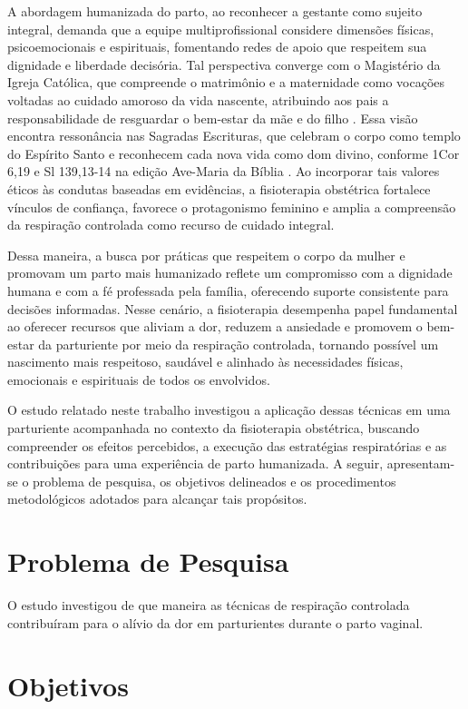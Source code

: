 \documentclass[openright]{tex/estilos/normas-utf-tex}
\begin{document}
A abordagem humanizada do parto, ao reconhecer a gestante como sujeito integral, demanda que a equipe multiprofissional considere dimensões físicas, psicoemocionais e espirituais, fomentando redes de apoio que respeitem sua dignidade e liberdade decisória. Tal perspectiva converge com o Magistério da Igreja Católica, que compreende o matrimônio e a maternidade como vocações voltadas ao cuidado amoroso da vida nascente, atribuindo aos pais a responsabilidade de resguardar o bem-estar da mãe e do filho \cite[p.~431-432]{catecismo2000}. Essa visão encontra ressonância nas Sagradas Escrituras, que celebram o corpo como templo do Espírito Santo e reconhecem cada nova vida como dom divino, conforme 1Cor 6,19 e Sl 139,13-14 na edição Ave-Maria da Bíblia \cite{biblia2018}. Ao incorporar tais valores éticos às condutas baseadas em evidências, a fisioterapia obstétrica fortalece vínculos de confiança, favorece o protagonismo feminino e amplia a compreensão da respiração controlada como recurso de cuidado integral.

Dessa maneira, a busca por práticas que respeitem o corpo da mulher e promovam um parto mais humanizado reflete um compromisso com a dignidade humana e com a fé professada pela família, oferecendo suporte consistente para decisões informadas. Nesse cenário, a fisioterapia desempenha papel fundamental ao oferecer recursos que aliviam a dor, reduzem a ansiedade e promovem o bem-estar da parturiente por meio da respiração controlada, tornando possível um nascimento mais respeitoso, saudável e alinhado às necessidades físicas, emocionais e espirituais de todos os envolvidos.

O estudo relatado neste trabalho investigou a aplicação dessas técnicas em uma parturiente acompanhada no contexto da fisioterapia obstétrica, buscando compreender os efeitos percebidos, a execução das estratégias respiratórias e as contribuições para uma experiência de parto humanizada. A seguir, apresentam-se o problema de pesquisa, os objetivos delineados e os procedimentos metodológicos adotados para alcançar tais propósitos.

\section{Problema de Pesquisa}
\label{sec:problema}

O estudo investigou de que maneira as técnicas de respiração controlada contribuíram para o alívio da dor em parturientes durante o parto vaginal.

\section{Objetivos}
\label{sec:objetivos}
\end{document}
